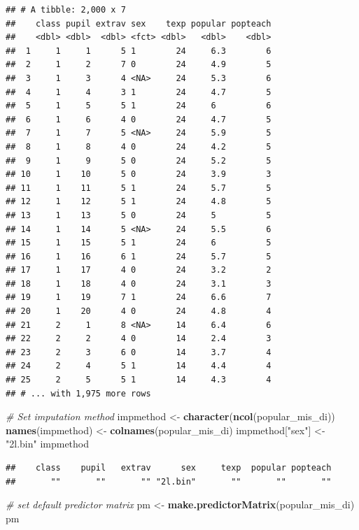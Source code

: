 \documentclass[
]{book}
\newenvironment{Shaded}{\begin{snugshade}}{\end{snugshade}}
\newcommand{\CommentTok}[1]{\textcolor[rgb]{0.56,0.35,0.01}{\textit{#1}}}
\newcommand{\KeywordTok}[1]{\textcolor[rgb]{0.13,0.29,0.53}{\textbf{#1}}}
\newcommand{\NormalTok}[1]{#1}
\newcommand{\StringTok}[1]{\textcolor[rgb]{0.31,0.60,0.02}{#1}}
\begin{document}
\begin{verbatim}
## # A tibble: 2,000 x 7
##    class pupil extrav sex    texp popular popteach
##    <dbl> <dbl>  <dbl> <fct> <dbl>   <dbl>    <dbl>
##  1     1     1      5 1        24     6.3        6
##  2     1     2      7 0        24     4.9        5
##  3     1     3      4 <NA>     24     5.3        6
##  4     1     4      3 1        24     4.7        5
##  5     1     5      5 1        24     6          6
##  6     1     6      4 0        24     4.7        5
##  7     1     7      5 <NA>     24     5.9        5
##  8     1     8      4 0        24     4.2        5
##  9     1     9      5 0        24     5.2        5
## 10     1    10      5 0        24     3.9        3
## 11     1    11      5 1        24     5.7        5
## 12     1    12      5 1        24     4.8        5
## 13     1    13      5 0        24     5          5
## 14     1    14      5 <NA>     24     5.5        6
## 15     1    15      5 1        24     6          5
## 16     1    16      6 1        24     5.7        5
## 17     1    17      4 0        24     3.2        2
## 18     1    18      4 0        24     3.1        3
## 19     1    19      7 1        24     6.6        7
## 20     1    20      4 0        24     4.8        4
## 21     2     1      8 <NA>     14     6.4        6
## 22     2     2      4 0        14     2.4        3
## 23     2     3      6 0        14     3.7        4
## 24     2     4      5 1        14     4.4        4
## 25     2     5      5 1        14     4.3        4
## # ... with 1,975 more rows
\end{verbatim}

\begin{Shaded}
\begin{Highlighting}[]
\CommentTok{# Set imputation method}
\NormalTok{impmethod <-}\StringTok{ }\KeywordTok{character}\NormalTok{(}\KeywordTok{ncol}\NormalTok{(popular_mis_di))}
\KeywordTok{names}\NormalTok{(impmethod) <-}\StringTok{ }\KeywordTok{colnames}\NormalTok{(popular_mis_di)}
\NormalTok{impmethod[}\StringTok{"sex"}\NormalTok{] <-}\StringTok{ "2l.bin"}
\NormalTok{impmethod}
\end{Highlighting}
\end{Shaded}

\begin{verbatim}
##    class    pupil   extrav      sex     texp  popular popteach 
##       ""       ""       "" "2l.bin"       ""       ""       ""
\end{verbatim}

\begin{Shaded}
\begin{Highlighting}[]
\CommentTok{# set default predictor matrix}
\NormalTok{pm <-}\StringTok{ }\KeywordTok{make.predictorMatrix}\NormalTok{(popular_mis_di)}
\NormalTok{pm}
\end{Highlighting}
\end{Shaded}
\end{document}
